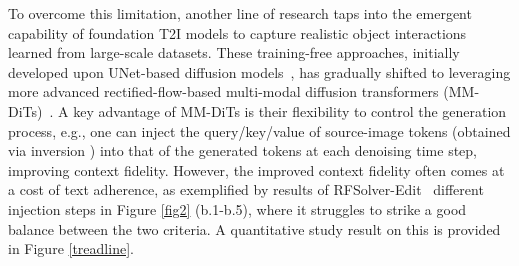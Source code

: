 \documentclass{article}
\begin{document}
To overcome this limitation, another line of research taps into the emergent capability of foundation T2I models to capture realistic object interactions learned from large-scale datasets.
{These training-free approaches, initially developed upon UNet-based diffusion models~\citep{hertz2022prompt, cao2023masactrl, tumanyan2023plug}, has gradually shifted to leveraging more advanced rectified-flow-based multi-modal diffusion transformers (MM-DiTs)~\citep{rout2024semantic, wang2024taming, deng2024fireflow, tewel2025addit, zhu2025kv}.
A key advantage of MM-DiTs is their flexibility to control the generation process, e.g., one can inject the query/key/value of source-image tokens (obtained via inversion \citep{deng2024fireflow,rout2024semantic,wang2024taming}) into that of the generated tokens at each denoising time step, improving context fidelity.}
{However, the improved context fidelity often comes at a cost of text adherence, as exemplified by results of RFSolver-Edit~\citep{wang2024taming} different injection steps in  Figure \ref{fig2} (b.1-b.5), where it struggles to strike a good balance between the two criteria. A quantitative study result on this is provided in Figure \ref{treadline}.}
\end{document}
